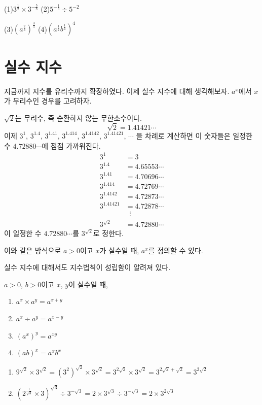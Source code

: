 \documentclass{oblivoir}
\begin{document}
%
\label{rational9}
\par\noindent
(1)\:\:\(3^{\frac12}\times3^{-\frac58}\)
(2)\:\:\(5^{-\frac13}\div5^{-2}\)
\par\noindent
(3)\:\:\((a^{\frac23})^{\frac35}\)
(4)\:\:\((a^{\frac12}b^{\frac14})^4\)
\newpage

\section{실수 지수}
지금까지 지수를 유리수까지 확장하였다.
이제 실수 지수에 대해 생각해보자.
\(a^x\)에서 \(x\)가 무리수인 경우를 고려하자.

%
\label{real1}
\(\sqrt2\)는 무리수, 즉 순환하지 않는 무한소수이다.
\[\sqrt2=1.41421\cdots\]
이제 \(3^1\), \(3^{1.4}\), \(3^{1.41}\), \(3^{1.414}\), \(3^{1.4142}\), \(3^{1.41421}\), \(\cdots\)
을 차례로 계산하면 이 숫자들은 일정한 수 \(4.72880\cdots\)에 점점 가까워진다.
\begin{align*}
3^1			&=3				\\
3^{1.4}		&=4.65553\cdots	\\
3^{1.41}		&=4.70696\cdots	\\
3^{1.414}		&=4.72769\cdots	\\
3^{1.4142}	&=4.72873\cdots	\\
3^{1.41421}	&=4.72878\cdots	\\
			&\;\;\vdots 			\\
3^{\sqrt2}		&=4.72880\cdots
\end{align*}
이 일정한 수 \(4.72880\cdots\)를 \(3^{\sqrt2}\)로 정한다.

이와 같은 방식으로 \(a>0\)이고 \(x\)가 실수일 때, \(a^x\)를 정의할 수 있다.

\newpage
실수 지수에 대해서도 지수법칙이 성립함이 알려져 있다.
%
\begin{mdframed}
%
\label{real2}
\(a>0\), \(b>0\)이고 \(x\), \(y\)이 실수일 때,
\begin{enumerate}
\item
\(a^x\times a^y=a^{x+y}\)
\item
\(a^x\div a^y=a^{x-y}\)
\item
\((a^x)^y=a^{xy}\)
\item
\((ab)^x=a^xb^x\)
\end{enumerate}
\end{mdframed}

%
\begin{enumerate}\label{real3}
\item
\(9^{\sqrt2}\times3^{\sqrt2}=(3^2)^{\sqrt2}\times3^{\sqrt2}=3^{2\sqrt2}\times3^{\sqrt2}=3^{2\sqrt2+\sqrt2}=3^{3\sqrt2}\)
\item
\((2^{\frac1{\sqrt3}}\times3)^{\sqrt3}\div3^{-\sqrt3}=2\times3^{\sqrt3}\div3^{-\sqrt3}=2\times3^{2\sqrt3}\)
\end{enumerate}
\end{document}
